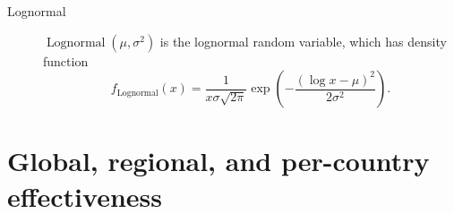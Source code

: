 \documentclass{article}
\DeclareMathOperator{\Lognormal}{Lognormal}
\begin{document}
\begin{description}
\item[Lognormal] $\Lognormal(\mu, \sigma^2)$ is the lognormal random
  variable, which has density function
  \begin{equation}
    f_{\Lognormal}(x) = \frac{1}{x \sigma \sqrt{2 \pi}}
    \exp\left(- \frac{\left(\log x - \mu\right)^2}{2 \sigma^2}\right).
  \end{equation}
\end{description}


\clearpage
\printbibliography


\clearpage
\newpage
\vspace*{3in}
\section{Global, regional, and per-country effectiveness}
\newpage

\end{document}
